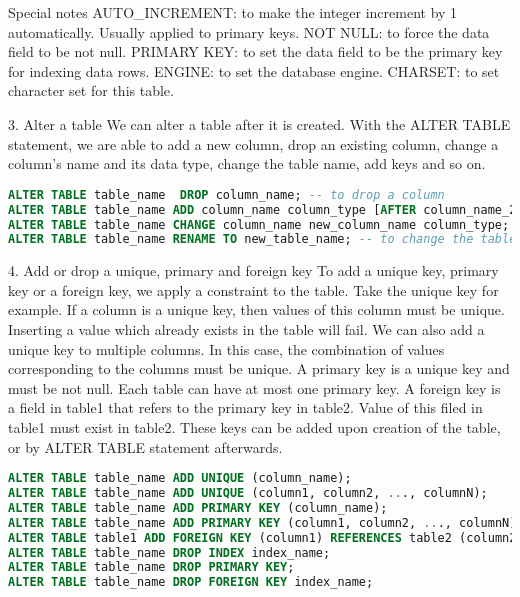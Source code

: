 Special notes
AUTO\_INCREMENT: to make the integer increment by 1 automatically. Usually applied to primary keys.
NOT NULL: to force the data field to be not null.
PRIMARY KEY: to set the data field to be the primary key for indexing data rows.
ENGINE: to set the database engine.
CHARSET: to set character set for this table.

3. Alter a table
We can alter a table after it is created. With the ALTER TABLE statement, we are able to add a new column, drop an existing column, change a column’s name and its data type, change the table name, add keys and so on.

\begin{lstlisting}[language=SQL]
ALTER TABLE table_name  DROP column_name; -- to drop a column
ALTER TABLE table_name ADD column_name column_type [AFTER column_name_2]; -- to add a column [after another column]
ALTER TABLE table_name CHANGE column_name new_column_name column_type; -- to change the column name and type
ALTER TABLE table_name RENAME TO new_table_name; -- to change the table name
\end{lstlisting}

4. Add or drop a unique, primary and foreign key
To add a unique key, primary key or a foreign key, we apply a constraint to the table. Take the unique key for example. If a column is a unique key, then values of this column must be unique. Inserting a value which already exists in the table will fail. We can also add a unique key to multiple columns. In this case, the combination of values corresponding to the columns must be unique. A primary key is a unique key and must be not null. Each table can have at most one primary key. A foreign key is a field in table1 that refers to the primary key in table2. Value of this filed in table1 must exist in table2. These keys can be added upon creation of the table, or by ALTER TABLE statement afterwards.

\begin{lstlisting}[language=SQL]
ALTER TABLE table_name ADD UNIQUE (column_name);
ALTER TABLE table_name ADD UNIQUE (column1, column2, ..., columnN);
ALTER TABLE table_name ADD PRIMARY KEY (column_name);
ALTER TABLE table_name ADD PRIMARY KEY (column1, column2, ..., columnN);
ALTER TABLE table1 ADD FOREIGN KEY (column1) REFERENCES table2 (column2);
ALTER TABLE table_name DROP INDEX index_name;
ALTER TABLE table_name DROP PRIMARY KEY;
ALTER TABLE table_name DROP FOREIGN KEY index_name;
\end{lstlisting}

